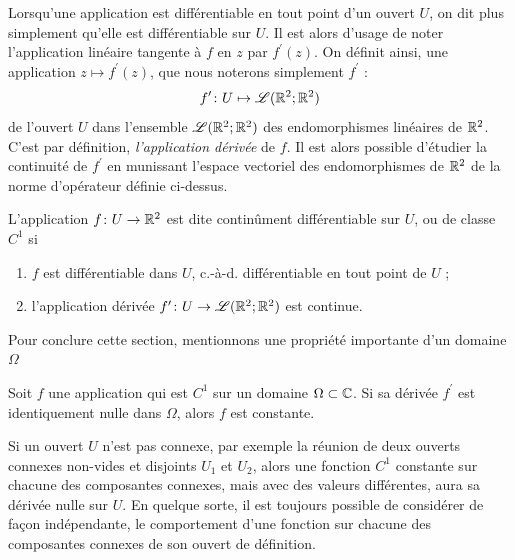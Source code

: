 Lorsqu'une application est différentiable en tout point d'un ouvert $U$, on dit plus simplement qu'elle est différentiable sur $U$. Il est alors d'usage de noter l'application linéaire tangente à $f$ en $z$ par $f^\prime(z)$. On définit ainsi, une application $z \mapsto f^\prime(z)$, que nous noterons simplement $f^\prime$ : 
\[ f^\prime \colon  U \mapsto \mathcal{L}(\mathbb R^2 ; \mathbb R^2)\]
de l'ouvert $U$ dans l'ensemble $\mathcal{L}(\mathbb R^2 ; \mathbb R^2)$ des endomorphismes linéaires de $\mathbb R^2$. C'est par définition, \textit{l'application dérivée} de $f$. Il est alors possible d'étudier la continuité de $f^\prime$ en munissant l'espace vectoriel des endomorphismes de $\mathbb R^2$ de la norme d'opérateur définie ci-dessus.


\begin{fdefn}
L'application $f \colon U \to \mathbb R^2$ est dite continûment différentiable sur $U$, ou de classe $C^1$ si
\begin{enumerate}
\item $f$ est différentiable dans $U$, c.-à-d. différentiable en tout point de $U$ ;
\item l'application dérivée $f^\prime \colon U \to \mathcal{L}(\mathbb R^2 ; \mathbb R^2)$ est continue.
\end{enumerate}  
\end{fdefn}

Pour conclure cette section, mentionnons une propriété importante d'un domaine $\Omega$
\begin{fprop} Soit $f$ une application qui est $C^1$ sur un domaine $\Omega \subset \mathbb{C}$. Si sa dérivée $f^\prime$ est identiquement nulle dans $\Omega$, alors $f$ est constante.
\end{fprop}

Si un ouvert $U$ n'est pas connexe, par exemple la réunion de deux ouverts connexes non-vides et disjoints $U_1$ et $U_2$, alors une fonction $C^1$ constante sur chacune des composantes connexes, mais avec des valeurs différentes, aura sa dérivée nulle sur $U$. En quelque sorte, il est toujours possible de considérer de façon indépendante, le comportement d'une fonction sur chacune des composantes connexes de son ouvert de définition. 


